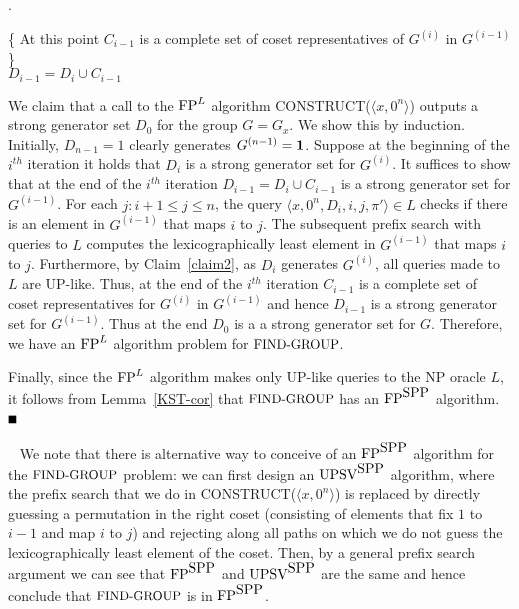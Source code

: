 \documentclass{article}
\newcommand{\bproof}{\noindent{\it Proof}}
\newcommand{\eproof}{\hspace*{\fill}$\rule{2mm}{2mm}$~~~~~\bigskip}
\renewenvironment{proof}{\bproof. }{\eproof}
\newenvironment{remark}{\begin{trivlist}%
\item[\hskip\labelsep{\bf Remark.}]~}{\end{trivlist}}
\newcommand{\FP}{\mbox{\rm FP}}
\newcommand{\UPSV}{\mbox{\rm UPSV}}
\newcommand{\SPP}{\mbox{\rm SPP}}
\newcommand{\FINDGROUP}{\mbox{\small\rm FIND{-}GROUP}}
\renewcommand{\th}[1]{\ensuremath{#1^{th}}}
\renewcommand{\angle}[1]{\langle #1\rangle}
\begin{document}
\begin{proof}
\begin{algorithm}[H]
{               \{ At this point $C_{i-1}$ is a complete set of coset
                representatives of $G^{(i)}$ in $G^{(i-1)}$\}\\
                $D_{i-1} = D_i \cup C_{i-1}$
        }
\end{algorithm}
        
We claim that a call to the $\FP^L$ algorithm
CONSTRUCT($\angle{x,0^n}$) outputs a strong generator set $D_0$ for
the group $G=G_x$. We show this by induction. Initially, $D_{n-1}=1$
clearly generates $G^{(n-1)}={\bf 1}$. Suppose at the beginning of the
$\th{i}$ iteration it holds that $D_i$ is a strong generator set for
$G^{(i)}$. It suffices to show that at the end of the $\th{i}$
iteration $D_{i-1} = D_i \cup C_{i-1}$ is a strong generator set for
$G^{(i-1)}$.  For each $j: i+1\leq j\leq n$, the query
$\angle{x,0^n,D_i,i,j,\pi'} \in L$ checks if there is an element in
$G^{(i-1)}$ that maps $i$ to $j$. The subsequent prefix search with
queries to $L$ computes the lexicographically least element in
$G^{(i-1)}$ that maps $i$ to $j$.  Furthermore, by Claim~\ref{claim2},
as $D_i$ generates $G^{(i)}$, all queries made to $L$ are UP-like.
Thus, at the end of the $\th{i}$ iteration $C_{i-1}$ is a complete set
of coset representatives for $G^{(i)}$ in $G^{(i-1)}$ and hence
$D_{i-1}$ is a strong generator set for $G^{(i-1)}$.  Thus at the end
$D_0$ is a a strong generator set for $G$. Therefore, we have an
$\FP^L$ algorithm problem for $\FINDGROUP$.

Finally, since the $\FP^L$ algorithm makes only UP-like queries to the
NP oracle $L$, it follows from Lemma~\ref{KST-cor} that $\FINDGROUP$
has an $\FP^{\SPP}$ algorithm.
\end{proof}

\begin{remark}
  We note that there is alternative way to conceive of an $\FP^{\SPP}$
  algorithm for the $\FINDGROUP$ problem: we can first design an
  $\UPSV^{\SPP}$ algorithm, where the prefix search that we do in
  CONSTRUCT($\angle{x,0^n}$) is replaced by directly guessing a
  permutation in the right coset (consisting of elements that fix $1$
  to $i-1$ and map $i$ to $j$) and rejecting along all paths on which
  we do not guess the lexicographically least element of the coset.
  Then, by a general prefix search argument we can see that
  $\FP^{\SPP}$ and $\UPSV^{\SPP}$ are the same and hence conclude that
  $\FINDGROUP$ is in $\FP^{\SPP}$.
\end{remark}
\end{document}
